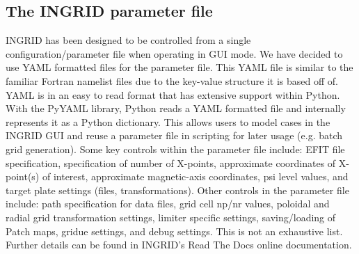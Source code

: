 \subsection{\label{sec:level2}The INGRID parameter file}
INGRID has been designed to be controlled from a single configuration/parameter file when operating in GUI mode. We have decided to use YAML formatted files for the parameter file\cite{PyYAML}. This YAML file is similar to the familiar Fortran namelist files due to the key-value structure it is based off of. YAML is in an easy to read format that has extensive support within Python. With the PyYAML library, Python reads a YAML formatted file and internally represents it as a Python dictionary. This allows users to model cases in the INGRID GUI and reuse a parameter file in scripting for later usage (e.g. batch grid generation). Some key controls within the parameter file include: EFIT file specification, specification of number of X-points, approximate coordinates of X-point(s) of interest, approximate magnetic-axis coordinates, psi level values, and target plate settings (files, transformations). Other controls in the parameter file include: path specification for data files, grid cell np/nr values, poloidal and radial grid transformation settings, limiter specific settings, saving/loading of Patch maps, gridue settings, and debug settings. This is not an exhaustive list. Further details can be found in INGRID's Read The Docs online documentation.